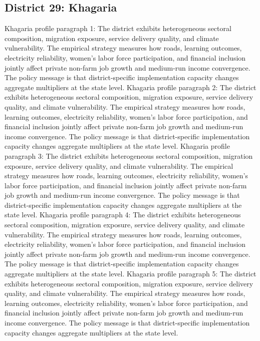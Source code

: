 \documentclass[preprint,12pt]{elsarticle}
\begin{document}
\subsection{District 29: Khagaria}
Khagaria profile paragraph 1: The district exhibits heterogeneous sectoral composition, migration exposure, service delivery quality, and climate vulnerability. The empirical strategy measures how roads, learning outcomes, electricity reliability, women's labor force participation, and financial inclusion jointly affect private non-farm job growth and medium-run income convergence. The policy message is that district-specific implementation capacity changes aggregate multipliers at the state level.
Khagaria profile paragraph 2: The district exhibits heterogeneous sectoral composition, migration exposure, service delivery quality, and climate vulnerability. The empirical strategy measures how roads, learning outcomes, electricity reliability, women's labor force participation, and financial inclusion jointly affect private non-farm job growth and medium-run income convergence. The policy message is that district-specific implementation capacity changes aggregate multipliers at the state level.
Khagaria profile paragraph 3: The district exhibits heterogeneous sectoral composition, migration exposure, service delivery quality, and climate vulnerability. The empirical strategy measures how roads, learning outcomes, electricity reliability, women's labor force participation, and financial inclusion jointly affect private non-farm job growth and medium-run income convergence. The policy message is that district-specific implementation capacity changes aggregate multipliers at the state level.
Khagaria profile paragraph 4: The district exhibits heterogeneous sectoral composition, migration exposure, service delivery quality, and climate vulnerability. The empirical strategy measures how roads, learning outcomes, electricity reliability, women's labor force participation, and financial inclusion jointly affect private non-farm job growth and medium-run income convergence. The policy message is that district-specific implementation capacity changes aggregate multipliers at the state level.
Khagaria profile paragraph 5: The district exhibits heterogeneous sectoral composition, migration exposure, service delivery quality, and climate vulnerability. The empirical strategy measures how roads, learning outcomes, electricity reliability, women's labor force participation, and financial inclusion jointly affect private non-farm job growth and medium-run income convergence. The policy message is that district-specific implementation capacity changes aggregate multipliers at the state level.
\end{document}
